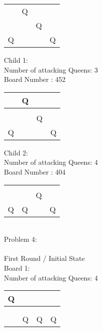 \documentclass[a4paper,10pt]{article}
\begin{document}
\begin{flushleft}
\begin{flushleft}
\begin{flushleft}
\begin{flushleft}
\begin{flushleft}
\begin{flushleft}
\begin{flushleft}
\begin{flushleft}
\begin{flushleft}
\begin{flushleft}
\begin{flushleft}
\begin{flushleft}
\begin{flushleft}
\begin{flushleft}
\begin{flushleft}
    \begin{tabular}{| l | l | l | l |}
    \hline
     & & & \\ \hline
     & Q & & \\ \hline
     & & Q & \\ \hline
     Q & & & Q \\ \hline
    \end{tabular}
\begin{flushleft}
Child 1:\\
Number of attacking Queens: 3 \\
Board Number : 452\\
\vspace{5mm}
    \begin{tabular}{| l | l | l | l |}
    \hline
     & Q & & \\ \hline
     & & & \\ \hline
     & & Q & \\ \hline
     Q & & & Q \\ \hline
    \end{tabular}
\begin{flushleft}
\break
Child 2:\\
Number of attacking Queens: 4 \\
Board Number : 404 \\
\vspace{5mm}
    \begin{tabular}{| l | l | l | l |}
    \hline
     & & & \\ \hline
     & & & \\ \hline
     & & Q & \\ \hline
     Q & Q & & Q \\ \hline
    \end{tabular}
\break
\vspace{5mm}
\\
Problem 4:\\
\vspace{2mm}
\hline
\\
First Round / Initial State\\
Board 1:\\
Number of attacking Queens: 4\\
\vspace{5mm}
    \begin{tabular}{| l | l | l | l |}
    \hline
     Q & & & \\ \hline
     & & & \\ \hline
     & & & \\ \hline
     & Q & Q & Q \\ \hline

\end{tabular}
\end{flushleft}
\end{flushleft}
\end{flushleft}
\end{flushleft}
\end{flushleft}
\end{flushleft}
\end{flushleft}
\end{flushleft}
\end{flushleft}
\end{flushleft}
\end{flushleft}
\end{flushleft}
\end{flushleft}
\end{flushleft}
\end{flushleft}
\end{flushleft}
\end{flushleft}
\end{document}
